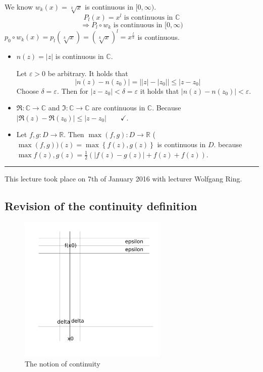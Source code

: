 \documentclass[a4paper,landscape,twocolumn]{article}
\theoremstyle{definition}
\newcommand\set[1]{\left\{#1\right\}}
\newcommand\abs[1]{\left|#1\right|}
\newcommand\meta[3]{\hrule{} This #1 took place on #2 with lecturer #3.\par}
\begin{document}
We know $w_k(x) = \sqrt[k]{x}$ is continuous in $[0,\infty)$.
\[ P_l(x) = x^l \text{ is continuous in } \mathbb C \]
\[ \Rightarrow P_l \circ w_k \text{ is continuous in } [0,\infty) \]
$p_0 \circ w_k (x) = p_l(\sqrt[k]{x}) = \left(\sqrt[k]{x}\right)^l = x^{\frac lk}$ is continuous.

\begin{itemize}
  \item $n(z) = \abs{z}$ is continuous in $\mathbb C$.

    Let $\varepsilon > 0$ be arbitrary. It holds that
    \[ \abs{n(z) - n(z_0)} = \abs{\abs{z} - \abs{z_0}} \leq \abs{z - z_0} \]
    Choose $\delta = \varepsilon$. Then for $\abs{z - z_0} < \delta = \varepsilon$ it holds
    that $\abs{n(z) - n(z_0)} < \varepsilon$.
  \item $\Re: \mathbb C \to \mathbb C$ and $\Im: \mathbb C \to \mathbb C$ are continuous in $\mathbb C$.
    Because $\abs{\Re(z) - \Re(z_0)} \leq \abs{z - z_0} \qquad \checkmark$.
  \item
    Let $f, g: D \to \mathbb R$. Then $\max(f, g): D \rightarrow \mathbb R$
    ($\max(f, g))(z) = \max\set{f(z), g(z)}$ is continuous in $D$.
    because $\max{f(z), g(z)} = \frac12 \left(\abs{f(z) - g(z)} + f(z) + f(z)\right)$.
\end{itemize}

\meta{lecture}{7th of January 2016}{Wolfgang Ring}

\subsection{Revision of the continuity definition}

\begin{figure}[!h]
  \begin{center}
    \includegraphics[width=200pt]{img/continuity_revised.pdf}
    \caption{The notion of continuity}
  \end{center}
\end{figure}
\end{document}
